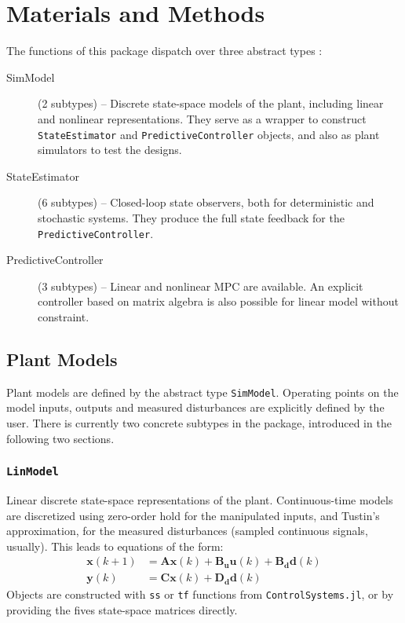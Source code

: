 
\section{Materials and Methods}

The functions of this package dispatch over three abstract types :
\begin{description}
    \item[SimModel] (2 subtypes) -- Discrete state-space models of the plant, including linear and nonlinear representations. They serve as a wrapper to construct \texttt{StateEstimator} and \texttt{PredictiveController} objects, and also as plant simulators to test the designs.
    \item[StateEstimator] (6 subtypes) -- Closed-loop state observers, both for deterministic and stochastic systems. They produce the full state feedback for the \texttt{PredictiveController}.
    \item[PredictiveController] (3 subtypes) -- Linear and nonlinear MPC are available. An explicit controller based on matrix algebra is also possible for linear model without constraint.
\end{description}

\subsection{Plant Models}

Plant models are defined by the abstract type \texttt{SimModel}. Operating points on the model inputs, outputs and measured disturbances are explicitly defined by the user. There is currently two concrete subtypes in the package, introduced in the following two sections.

\subsubsection{\textnormal{\texttt{LinModel}}}

Linear discrete state-space representations of the plant. Continuous-time models are discretized using zero-order hold for the manipulated inputs, and Tustin's approximation, for the measured disturbances (sampled continuous signals, usually). This leads to equations of the form:
\begin{subequations}
\begin{align}
    \mathbf{x}(k+1) &= \mathbf{A x}(k) + \mathbf{B_u u}(k) + \mathbf{B_d d}(k) \\
    \mathbf{y}(k)   &= \mathbf{C x}(k) + \mathbf{D_d d}(k)
\end{align}
\end{subequations}
Objects are constructed with \texttt{ss} or \texttt{tf} functions from \texttt{ControlSystems.jl}, or by providing the fives state-space matrices directly.

